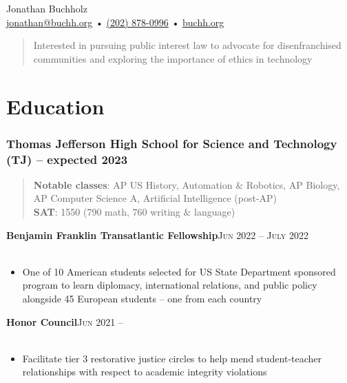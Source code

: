 \documentclass[12pt, a4paper]{article}
\begin{document}
{\LARGE Jonathan Buchholz}\\
\href{mailto:jonathan@buchh.org}{jonathan@buchh.org} • \href{tel:2028780996}{(202) 878-0996} • \href{https://buchh.org}{buchh.org}\\

\vspace{-6mm}
\begin{quote}
Interested in pursuing public interest law to advocate for disenfranchised communities and exploring the importance of ethics in technology\\
\end{quote}

\vspace{-14mm}
\section*{Education}
\vspace{-4mm}

\subsubsection*{Thomas Jefferson High School for Science and Technology (TJ) -- expected 2023}

\begin{quote}

\vspace{-1mm}
\textbf{Notable classes}: AP US History, Automation \& Robotics, AP Biology, AP Computer Science A, Artificial Intelligence (post-AP)\\

\vspace{-6mm}
\textbf{SAT}: 1550 (790 math, 760 writing \& language)\\

\end{quote}

\vspace{-6mm}
\textbf{Benjamin Franklin Transatlantic Fellowship}\hfill\textsc{Jun 2022 -- July 2022}\\\
\begin{itemize}
    \vspace{-8mm}
    \item One of 10 American students selected for US State Department sponsored program to learn diplomacy, international relations, and public policy alongside 45 European students – one from each country
\end{itemize}

\textbf{Honor Council}\hfill\textsc{Jun 2021 --}\\\
\begin{itemize}
    \vspace{-8mm}
    \item Facilitate tier 3 restorative justice circles to help mend student-teacher relationships with respect to academic integrity violations
\end{itemize}
\end{document}
